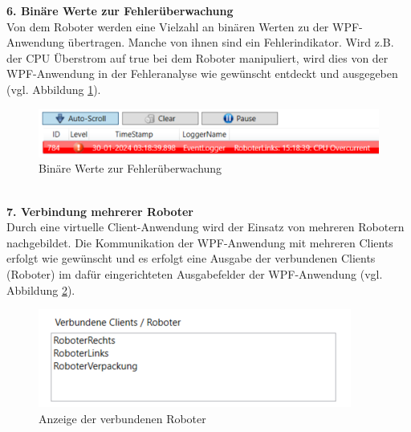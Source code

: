 \documentclass[ a4paper,
                oneside,
                toc=bibliography,
                toc=listof
                ]{scrbook}
\begin{document}
   	\textbf{6. Binäre Werte zur Fehlerüberwachung}\\
   	Von dem Roboter werden eine Vielzahl an binären Werten zu der WPF-Anwendung übertragen. Manche von ihnen sind ein Fehlerindikator. Wird z.B. der CPU Überstrom auf true bei dem Roboter manipuliert, wird dies von der WPF-Anwendung in der Fehleranalyse wie gewünscht entdeckt und ausgegeben (vgl. Abbildung \ref{fig:binarFehler}).
   	\begin{figure}[!ht]
   		\centering
   		\includegraphics[width=0.7\linewidth]{./images/BinarFehler.png}
   		\caption{Binäre Werte zur Fehlerüberwachung}
   		\label{fig:binarFehler}
   	\end{figure}\\
   	\textbf{7. Verbindung mehrerer Roboter}\\
   	Durch eine virtuelle Client-Anwendung wird der Einsatz von mehreren Robotern nachgebildet. Die Kommunikation der WPF-Anwendung mit mehreren Clients erfolgt wie gewünscht und es erfolgt eine Ausgabe der verbundenen Clients (Roboter) im dafür eingerichteten Ausgabefelder der WPF-Anwendung (vgl. Abbildung \ref{fig:VerbundeneRoboter}).
   	\begin{figure}[!ht]
   		\centering
   		\includegraphics[width=0.7\linewidth]{./images/VerbundeneRoboter.png}
   		\caption{Anzeige der verbundenen Roboter}
   		\label{fig:VerbundeneRoboter}
   	\end{figure}\\
\end{document}
